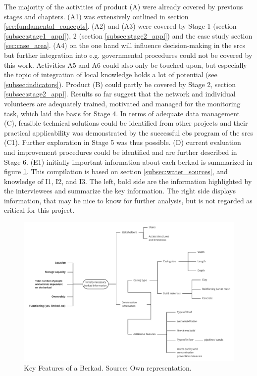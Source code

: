 The majority of the activities of product (A) were already covered by previous stages and chapters. (A1) was extensively outlined in section \ref{sec:fundamental_concepts}. (A2) and (A3) were covered by Stage 1 (section \ref{subsec:stage1_appl}), 2 (section \ref{subsec:stage2_appl}) and the case study section \ref{sec:case_area}. (A4) on the one hand will influence decision-making in the \acrshort{srcs} but further integration into e.g. governmental procedures could not be covered by this work. Activities A5 and A6 could also only be touched upon, but especially the topic of integration of local knowledge holds a lot of potential (see \ref{subsec:indicators}).\newline
Product (B) could partly be covered by Stage 2, section \ref{subsec:stage2_appl}. Results so far suggest that the network and individual volunteers are adequately trained, motivated and managed for the monitoring task, which laid the basis for Stage 4. In terms of adequate data management (C), feasible technical solutions could be identified from other projects and their practical applicability was demonstrated by the successful \acrshort{cbs} program of the \acrshort{srcs} (C1). Further exploration in Stage 5 was thus possible. (D) current evaluation and improvement procedures could be identified and are further described in Stage 6.\newline
(E1) initially important information about each berkad is summarized in figure \ref{fig:res_berkad}. This compilation is based on section \ref{subsec:water_sources}, and knowledge of I1, I2, and I3. The left, bold side are the information highlighted by the interviewees and summarize the key information. The right side displays information, that may be nice to know for further analysis, but is not regarded as critical for this project.

\begin{figure}[!htp]
    \centering
    \includegraphics[width=1.0\textwidth]{figures/2023_MA_results_berkad.pdf}
    \decoRule
    \caption[Key Features of a Berkad]{Key Features of a Berkad. Source: Own representation.}
    \label{fig:res_berkad}
\end{figure}

